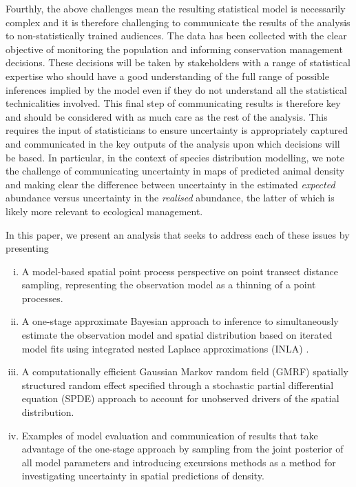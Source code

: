 \documentclass[preprint,12pt]{elsarticle}
\begin{document}
Fourthly, the above challenges mean the resulting statistical model is necessarily complex and it is therefore challenging to communicate the results of the analysis to non-statistically trained audiences.  The data has been collected with the clear objective of monitoring the population and informing conservation management decisions.  These decisions will be taken by stakeholders with a range of statistical expertise who should have a good understanding of the full range of possible inferences implied by the model even if they do not understand all the statistical technicalities involved.  This final step of communicating results is therefore key and should be considered with as much care as the rest of the analysis.  This requires the input of statisticians to ensure uncertainty is appropriately captured and communicated in the key outputs of the analysis upon which decisions will be based.  In particular, in the context of species distribution modelling, we note the challenge of communicating uncertainty in maps of predicted animal density and making clear the difference between uncertainty in the estimated \textit{expected} abundance versus uncertainty in the \textit{realised} abundance, the latter of which is likely more relevant to ecological management.

In this paper, we present an analysis that seeks to address each of these issues by presenting

\begin{enumerate}[(i)]
	\item A model-based spatial point process perspective on point transect distance sampling, representing the observation model as a thinning of a point processes.
	\item A one-stage approximate Bayesian approach to inference to simultaneously estimate the observation model and spatial distribution based on iterated model fits using integrated nested Laplace approximations (INLA) \citep{rue_approximate_2009}.
	\item A computationally efficient Gaussian Markov random field (GMRF) spatially structured random effect specified through a stochastic partial differential equation (SPDE) approach \citep{lindgren_explicit_2011} to account for unobserved drivers of the spatial distribution.
	\item Examples of model evaluation and communication of results that take advantage of the one-stage approach by sampling from the joint posterior of all model parameters and introducing excursions methods \citep{bolin_excursion_2015} as a method for investigating uncertainty in spatial predictions of density.
\end{enumerate}
\end{document}

